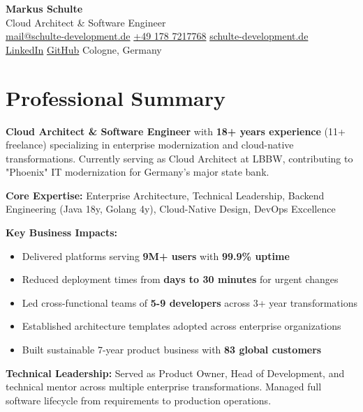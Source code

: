 \documentclass[11pt,a4paper]{article}
\begin{document}
\begin{center}
    {\Huge\sffamily\bfseries\color{darkblue} Markus Schulte}\\[8pt]
    {\Large\sffamily\color{mediumblue} Cloud Architect \& Software Engineer}\\[12pt]
    {\large\sffamily 
        \href{mailto:mail@schulte-development.de}{mail@schulte-development.de} \textbar{} 
        \href{tel:+4917872177768}{+49 178 7217768} \textbar{}
        \href{https://schulte-development.de}{schulte-development.de}\\[4pt]
        \href{https://www.linkedin.com/in/markus-schulte/}{LinkedIn} \textbar{}
        \href{https://github.com/SchulteDev}{GitHub} \textbar{}
        Cologne, Germany
    }
\end{center}

\vspace{6pt}

\section{Professional Summary}

\textbf{Cloud Architect \& Software Engineer} with \textbf{18+ years experience} (11+ freelance) specializing in enterprise modernization and cloud-native transformations. Currently serving as Cloud Architect at LBBW, contributing to "Phoenix" IT modernization for Germany's major state bank.

\textbf{Core Expertise:} Enterprise Architecture, Technical Leadership, Backend Engineering (Java 18y, Golang 4y), Cloud-Native Design, DevOps Excellence

\textbf{Key Business Impacts:}
\begin{itemize}
    \item Delivered platforms serving \textbf{9M+ users} with \textbf{99.9\% uptime}
    \item Reduced deployment times from \textbf{days to 30 minutes} for urgent changes
    \item Led cross-functional teams of \textbf{5-9 developers} across 3+ year transformations
    \item Established architecture templates adopted across enterprise organizations
    \item Built sustainable 7-year product business with \textbf{83 global customers}
\end{itemize}

\textbf{Technical Leadership:} Served as Product Owner, Head of Development, and technical mentor across multiple enterprise transformations. Managed full software lifecycle from requirements to production operations.
\end{document}
